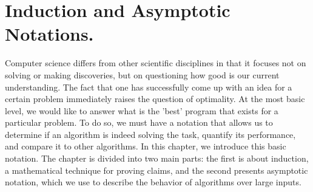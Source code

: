 
\newcommand*{\RECITATION}{}%

\chapter{Induction and Asymptotic Notations.}
Computer science differs from other scientific disciplines in that it focuses not on solving or making discoveries, but on questioning how good is our current understanding. The fact that one has successfully come up with an idea for a certain problem immediately raises the question of optimality. At the most basic level, we would like to answer what is the 'best'  program that exists for a particular problem. To do so, we must have a notation that allows us to determine if an algorithm is indeed solving the task, quantify its performance, and compare it to other algorithms. In this chapter, we introduce this basic notation. The chapter is divided into two main parts: the first is about induction, a mathematical technique for proving claims, and the second presents asymptotic notation, which we use to describe the behavior of algorithms over large inputs.
 

